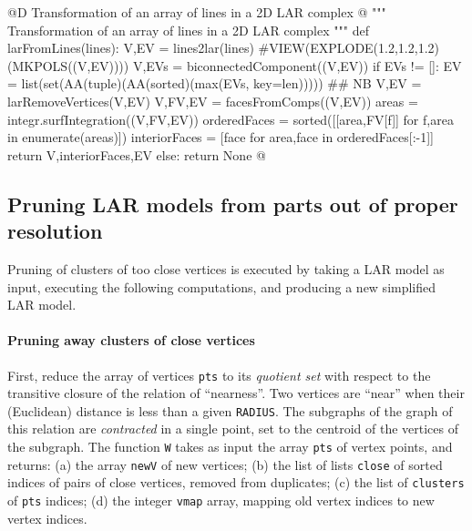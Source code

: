 \documentclass[11pt,oneside]{article}    %
\begin{document}
@D Transformation of an array of lines in a 2D LAR complex @{
""" Transformation of an array of lines in a 2D LAR complex """
def larFromLines(lines):
    V,EV = lines2lar(lines)
    #VIEW(EXPLODE(1.2,1.2,1.2)(MKPOLS((V,EV))))
    V,EVs = biconnectedComponent((V,EV))
    if EVs != []:
        EV = list(set(AA(tuple)(AA(sorted)(max(EVs, key=len)))))  ## NB
        V,EV = larRemoveVertices(V,EV)
        V,FV,EV = facesFromComps((V,EV))
        areas = integr.surfIntegration((V,FV,EV))
        orderedFaces = sorted([[area,FV[f]] for f,area in enumerate(areas)])
        interiorFaces = [face for area,face in orderedFaces[:-1]]
        return V,interiorFaces,EV
    else: return None
@}



\subsection{Pruning LAR models from parts out of proper resolution}

Pruning of clusters of too close vertices is executed by taking a LAR model as input, 
executing the following computations, and producing a new simplified LAR model.

\paragraph{Pruning away clusters of close vertices}
First, reduce the array of vertices \texttt{pts} to its \emph{quotient set} with respect to the transitive closure of the relation of ``nearness''. Two vertices are ``near'' when their (Euclidean) distance is less than a given \texttt{RADIUS}. The subgraphs of the graph of this relation are \emph{contracted} in a single point, set to the centroid of the vertices of the subgraph. The function \texttt{W} takes as input the array \texttt{pts} of vertex points, and returns: (a) the array \texttt{newV} of new vertices; (b) the list of lists \texttt{close} of sorted indices of pairs of close vertices, removed from duplicates; (c) the list of \texttt{clusters} of \texttt{pts} indices; (d) the integer  \texttt{vmap} array, mapping old vertex indices to new vertex indices.
\end{document}
